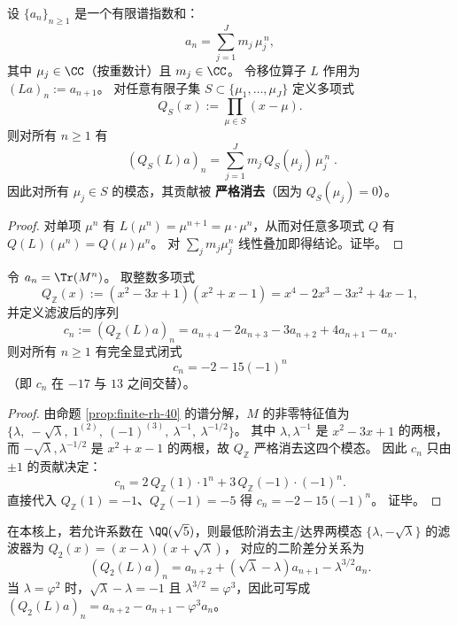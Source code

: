 \begin{proposition}\label{prop:finite-rh-spectral-annihilation-filter}
设 \(\{a_n\}_{n\ge 1}\) 是一个有限谱指数和：
\[
a_n=\sum_{j=1}^{J} m_j\,\mu_j^{\,n},
\]
其中 \(\mu_j\in\CC\)（按重数计）且 \(m_j\in\CC\)。
令移位算子 \(L\) 作用为 \((La)_n:=a_{n+1}\)。
对任意有限子集 \(S\subset\{\mu_1,\dots,\mu_J\}\) 定义多项式
\[
Q_S(x):=\prod_{\mu\in S}(x-\mu).
\]
则对所有 \(n\ge 1\) 有
\[
\boxed{\;
(Q_S(L)a)_n=\sum_{j=1}^{J} m_j\,Q_S(\mu_j)\,\mu_j^{\,n}\; }.
\]
因此对所有 \(\mu_j\in S\) 的模态，其贡献被 \textbf{严格消去}（因为 \(Q_S(\mu_j)=0\)）。
\end{proposition}
\begin{proof}
对单项 \(\mu^n\) 有 \(L(\mu^n)=\mu^{n+1}=\mu\cdot \mu^n\)，从而对任意多项式 \(Q\) 有 \(Q(L)(\mu^n)=Q(\mu)\mu^n\)。
对 \(\sum_j m_j\mu_j^n\) 线性叠加即得结论。证毕。
\end{proof}

\begin{corollary}\label{cor:real-input-40-spectral-annihilation-filter}
令 \(a_n=\Tr(M^n)\)。
取整数多项式
\[
Q_{\mathbb{Z}}(x):=(x^2-3x+1)(x^2+x-1)=x^4-2x^3-3x^2+4x-1,
\]
并定义滤波后的序列
\[
c_n:=(Q_{\mathbb{Z}}(L)a)_n
=a_{n+4}-2a_{n+3}-3a_{n+2}+4a_{n+1}-a_n.
\]
则对所有 \(n\ge 1\) 有完全显式闭式
\[
\boxed{\;c_n=-2-15(-1)^n\;}
\]
（即 \(c_n\) 在 \(-17\) 与 \(13\) 之间交替）。
\end{corollary}
\begin{proof}
由命题 \ref{prop:finite-rh-40} 的谱分解，\(M\) 的非零特征值为
\(\{\lambda,\ -\sqrt{\lambda},\ 1^{(2)},\ (-1)^{(3)},\ \lambda^{-1},\ \lambda^{-1/2}\}\)。
其中
\(\lambda,\lambda^{-1}\)
是 \(x^2-3x+1\) 的两根，而
\(-\sqrt{\lambda},\lambda^{-1/2}\)
是 \(x^2+x-1\) 的两根，故 \(Q_{\mathbb{Z}}\) 严格消去这四个模态。
因此 \(c_n\) 只由 \(\pm 1\) 的贡献决定：
\[
c_n=2\,Q_{\mathbb{Z}}(1)\cdot 1^n+3\,Q_{\mathbb{Z}}(-1)\cdot (-1)^n.
\]
直接代入 \(Q_{\mathbb{Z}}(1)=-1\)、\(Q_{\mathbb{Z}}(-1)=-5\) 得
\(
c_n=-2-15(-1)^n
\)。
证毕。
\end{proof}

\begin{remark}\label{rem:real-input-40-spectral-annihilation-filter-q2}
在本核上，若允许系数在 \(\QQ(\sqrt5)\)，则最低阶消去主/达界两模态 \(\{\lambda,-\sqrt{\lambda}\}\) 的滤波器为
\(
Q_2(x)=(x-\lambda)(x+\sqrt{\lambda})
\)，
对应的二阶差分关系为
\[
(Q_2(L)a)_n=a_{n+2}+(\sqrt{\lambda}-\lambda)a_{n+1}-\lambda^{3/2}a_n.
\]
当 \(\lambda=\varphi^2\) 时，\(\sqrt{\lambda}-\lambda=-1\) 且 \(\lambda^{3/2}=\varphi^3\)，因此可写成
\(
(Q_2(L)a)_n=a_{n+2}-a_{n+1}-\varphi^3 a_n
\)。
\end{remark}

